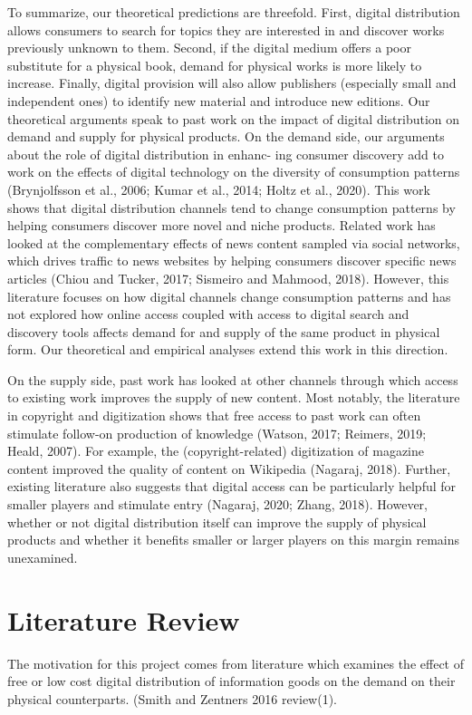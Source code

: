 \documentclass{article}
\begin{document}
To summarize, our theoretical predictions are threefold. First, digital distribution allows consumers to search for topics they are interested in and discover works previously unknown to them. Second, if the digital medium offers a poor substitute for a physical book, demand for physical works is more likely to increase. Finally, digital provision will also allow publishers (especially small and independent ones) to identify new material and introduce new editions.
Our theoretical arguments speak to past work on the impact of digital distribution on demand and supply for physical products. On the demand side, our arguments about the role of digital distribution in enhanc- ing consumer discovery add to work on the effects of digital technology on the diversity of consumption patterns (Brynjolfsson et al., 2006; Kumar et al., 2014; Holtz et al., 2020). This work shows that digital distribution channels tend to change consumption patterns by helping consumers discover more novel and niche products. Related work has looked at the complementary effects of news content sampled via social networks, which drives traffic to news websites by helping consumers discover specific news articles (Chiou and Tucker, 2017; Sismeiro and Mahmood, 2018). However, this literature focuses on how digital channels change consumption patterns and has not explored how online access coupled with access to digital search and discovery tools affects demand for and supply of the same product in physical form. Our theoretical and empirical analyses extend this work in this direction.

On the supply side, past work has looked at other channels through which access to existing work improves the supply of new content. Most notably, the literature in copyright and digitization shows that free access to past work can often stimulate follow-on production of knowledge (Watson, 2017; Reimers, 2019; Heald, 2007). For example, the (copyright-related) digitization of magazine content improved the quality of content on Wikipedia (Nagaraj, 2018). Further, existing literature also suggests that digital access can be particularly helpful for smaller players and stimulate entry (Nagaraj, 2020; Zhang, 2018). However, whether or not digital distribution itself can improve the supply of physical products and whether it benefits smaller or larger players on this margin remains unexamined.

\section{Literature Review}
The motivation for this project comes from literature which examines the effect of free or low cost digital distribution of information goods on the demand on their physical counterparts. (Smith and Zentners 2016 review(1). 
\end{document}
